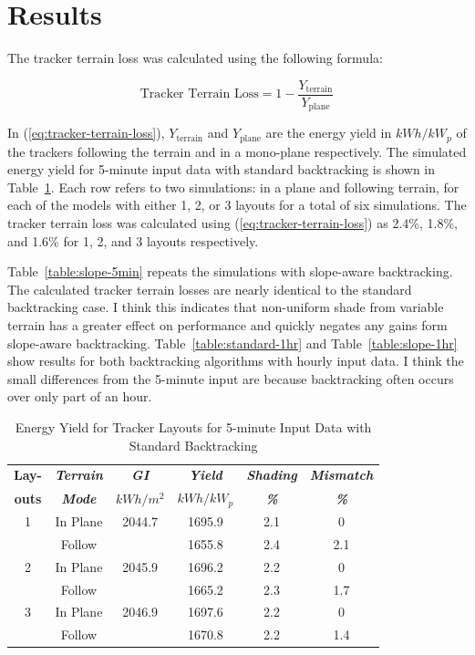 \documentclass[conference]{IEEEtran}
\begin{document}
\section{Results}

The tracker terrain loss was calculated using the following formula:

\begin{equation}
\text{Tracker Terrain Loss} = 1 - \frac{Y_\text{terrain}}{Y_\text{plane}}\label{eq:tracker-terrain-loss}
\end{equation}

In (\ref{eq:tracker-terrain-loss}), $Y_\text{terrain}$ and $Y_\text{plane}$ are the energy yield in $kWh/kW_p$ of the trackers following the terrain and in a mono-plane respectively. The simulated energy yield for 5-minute input data with standard backtracking is shown in Table~\ref{table:standard-5min}. Each row refers to two simulations: in a plane and following terrain, for each of the models with either 1, 2, or 3 layouts for a total of six simulations. The tracker terrain loss was calculated using (\ref{eq:tracker-terrain-loss}) as 2.4\%, 1.8\%, and 1.6\% for 1, 2, and 3 layouts respectively.

Table~\ref{table:slope-5min} repeats the simulations with slope-aware backtracking. The calculated tracker terrain losses are nearly identical to the standard backtracking case. I think this indicates that non-uniform shade from variable terrain has a greater effect on performance and quickly negates any gains form slope-aware backtracking. Table~\ref{table:standard-1hr} and Table~\ref{table:slope-1hr} show results for both backtracking algorithms with hourly input data. I think the small differences from the 5-minute input are because backtracking often occurs over only part of an hour.

\begin{table}[htbp]
\caption{Energy Yield for Tracker Layouts for 5-minute Input Data with Standard Backtracking}
\begin{center}
\begin{tabular}{|c|c|c|c|c|c|}
\hline
\textbf{Lay-}& \textbf{\textit{Terrain}}& \textbf{\textit{GI}}&        \textbf{\textit{Yield}}&        \textbf{\textit{Shading}}& \textbf{\textit{Mismatch}} \\
\textbf{outs}& \textbf{\textit{Mode}}&    \textbf{\textit{$kWh/m^2$}}& \textbf{\textit{$kWh / kW_p$}}& \textbf{\textit{\%}}&      \textbf{\textit{\%}} \\
\hline
1& In Plane& 2044.7&  1695.9& 2.1& 0 \\
 & Follow&         &  1655.8& 2.4& 2.1 \\
\hline
2& In Plane& 2045.9&  1696.2& 2.2& 0 \\
 & Follow&         &  1665.2& 2.3& 1.7 \\
\hline
3& In Plane& 2046.9&  1697.6& 2.2& 0 \\
 & Follow&         &  1670.8& 2.2& 1.4 \\
\hline
\end{tabular}
\label{table:standard-5min}
\end{center}
\end{table}
\end{document}
